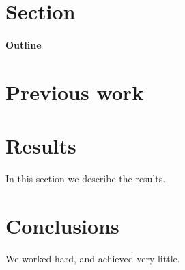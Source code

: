 \documentclass[12pt]{article}
\begin{document}
\maketitle

\section{Section}

\paragraph{Outline}


\section{Previous work}\label{previous work}

\section{Results}\label{results}
In this section we describe the results.

\section{Conclusions}\label{conclusions}
We worked hard, and achieved very little.
\end{document}
